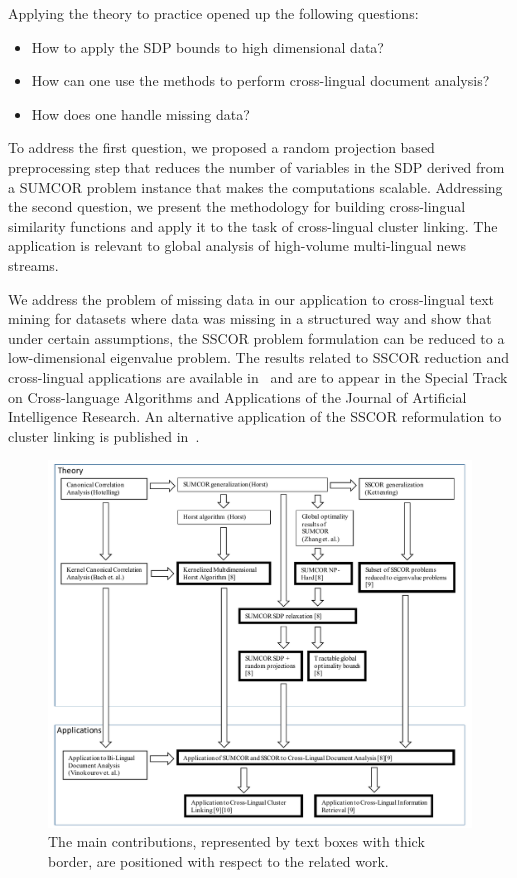 Applying the theory to practice opened up the following questions:
\begin{itemize}
\item How to apply the SDP bounds to high dimensional data?
\item How can one use the methods to perform cross-lingual document analysis?
\item How does one handle missing data?
\end{itemize}
To address the first question, we proposed a random projection based preprocessing step that reduces the number
of variables in the SDP derived from a SUMCOR problem instance that makes the computations scalable. Addressing
the second question, we present the methodology for building cross-lingual similarity functions and apply it
to the task of cross-lingual cluster linking. The application is relevant to global analysis of high-volume
multi-lingual news streams.

We address the problem of missing data in our application to cross-lingual text mining for datasets where
data was missing in a structured way and show that under certain assumptions, the SSCOR problem formulation
can be reduced to a low-dimensional eigenvalue problem. The results related to SSCOR reduction and
cross-lingual applications are available in~\cite{jair_rupnik} and are to appear in the
Special Track on Cross-language Algorithms and Applications of the Journal of Artificial Intelligence Research.
An alternative application of the SSCOR reformulation to cluster linking is published in~\cite{Belyaeva201564}.

\begin{figure}[t]
\centering
\includegraphics[width=1\textwidth]{figures/position_of_work.pdf}
\caption{\label{fig:position_of_work} The main contributions, represented by text boxes with thick border, are
positioned with respect to the related work.}
\end{figure}

